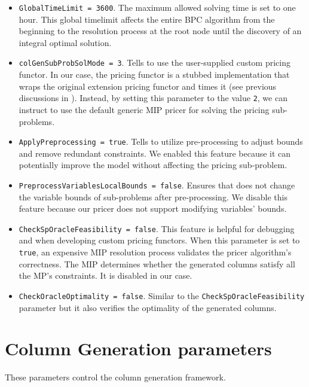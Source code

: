 \begin{itemize}
	\item \texttt{GlobalTimeLimit = 3600}.
	      The maximum allowed solving time is set to one hour.
	      This global timelimit affects the entire BPC algorithm
	      from the beginning to the resolution process at the root node
	      until the discovery of an integral optimal solution.
	\item \texttt{colGenSubProbSolMode = 3}.
	      Tells \bapcod{} to use the user-supplied custom pricing functor.
	      In our case, the pricing functor is a stubbed implementation that wraps
	      the original \vrpsolver{} extension pricing functor
	      and times it
	      (see previous discussions in ).
	      Instead, by setting this parameter to the value \texttt{2},
	      we can instruct \bapcod{} to use the default generic MIP pricer for solving the pricing sub-problems.
	\item \texttt{ApplyPreprocessing = true}.
	      Tells \bapcod{} to utilize pre-processing to adjust bounds and remove redundant constraints.
	      We enabled this feature because it can potentially improve the model
	      without affecting the pricing sub-problem.
	\item \texttt{PreprocessVariablesLocalBounds = false}.
	      Ensures that \bapcod{} does not change the variable bounds of sub-problems after pre-processing.
	      We disable this feature because our pricer does not support modifying variables' bounds.
	\item \texttt{CheckSpOracleFeasibility = false}.
	      This feature is helpful for debugging and when developing custom pricing functors.
	      When this parameter is set to \texttt{true},
	      an expensive MIP resolution process validates the pricer algorithm's correctness.
	      The MIP determines whether the generated columns satisfy all the MP's constraints.
	      It is disabled in our case.
	\item \texttt{CheckOracleOptimality = false}.
	      Similar to the \texttt{CheckSpOracleFeasibility} parameter but it also verifies the optimality of the generated columns.
\end{itemize}

\section{Column Generation parameters}

These parameters control the column generation framework.

